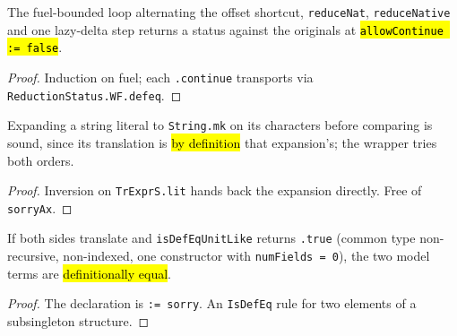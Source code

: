 \begin{lemma}
  \label{thm:vtc-lazydeltaloop}
  \leanok

   The fuel-bounded loop alternating the offset shortcut, \texttt{reduceNat},
  \texttt{reduceNative} and one lazy-delta step returns a status against the originals at
  \hl{\texttt{allowContinue := false}}.
\end{lemma}
\begin{proof}
  \leanok
   Induction on fuel; each \texttt{.continue} transports via
  \texttt{ReductionStatus.WF.defeq}.
\end{proof}

\begin{lemma}
  \label{thm:vtc-trystringlit}
  \leanok

   Expanding a string literal to \texttt{String.mk} on its characters before
  comparing is sound, since its translation is \hl{by definition} that expansion's; the wrapper
  tries both orders.
\end{lemma}
\begin{proof}
  \leanok
   Inversion on \texttt{TrExprS.lit} hands back the expansion directly. Free of
  \texttt{sorryAx}.
\end{proof}

\begin{lemma}
  \label{thm:vtc-isdefequnitlike}
  \leanok

   If both sides translate and \texttt{isDefEqUnitLike} returns \texttt{.true}
  (common type non-recursive, non-indexed, one constructor with \texttt{numFields = 0}), the two
  model terms are \hl{definitionally equal}.
\end{lemma}
\begin{proof}
  \stSorry{} The declaration is \texttt{:= sorry}.
   An \texttt{IsDefEq} rule for two elements of a subsingleton structure.
\end{proof}

